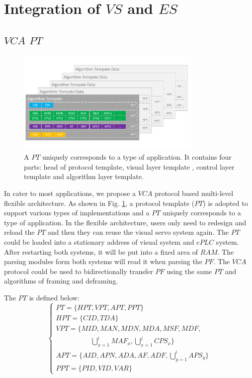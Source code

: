 \documentclass[journal,UTF8]{IEEEtran}
\begin{document}
\section{Integration of $VS$ and $ES$}
\label{Integration}

\subsection{$VCA$ $PT$}
\begin{figure}
\centering
\includegraphics[width=3.5in]{fig/PT.pdf}
\caption{A $PT$ uniquely corresponds to a type of application. It contains four parts: head of protocol template, visual layer template , control layer template and algorithm layer template.}
\label{fig:PT}
\end{figure}
In cater to most applications, we propose a $VCA$ protocol based multi-level flexible architecture. As shown in Fig. \ref{fig:PT}, a protocol template ($PT$) is adopted to support various types of implementations and a $PT$ uniquely corresponds to a type of application. In the flexible architecture, users only need to redesign and reload the $PT$ and then they can reuse the visual servo system again. The $PT$ could be loaded into a stationary address of visual system and $ePLC$ system. After restarting both systems, it will be put into a fixed area of $RAM$. The parsing modules form both systems will read it when parsing the $PF$. The $VCA$ protocol could be used to bidirectionally transfer $PF$ using the same $PT$ and algorithms of framing and deframing.  
 
 The $PT$ is defined below:
  \begin{equation}
 \left\{
 \begin{array}{l}
 PT = \{HPT, VPT, APT, PPT\}\\
 HPT = \{CID, TDA\}\\
 VPT = \{MID, MAN, MDN, MDA, MSF, MDF, \\
 \qquad\qquad\quad \bigcup_{x=1}^i MAF_x, \bigcup_{x=1}^j CPS_x\}\\
 APT = \{AID, APN, ADA, AF, ADF, \bigcup_{y=1}^i APS_y\}\\
 PPT = \{PID, VID, VAR\}
 \end{array}
 \right.
 \end{equation}
 
\end{document}

